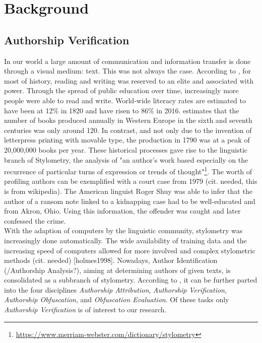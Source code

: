 \chapter{Background}\label{ch:background}
\section{Authorship Verification}\label{sec:authorship-verification}
In our world a large amount of communication and information transfer is done through a visual medium: text.
This was not always the case.
According to \cite{owidliteracy}, for most of history, reading and writing was reserved to an elite and associated with power.
Through the spread of public education over time, increasingly more people were able to read and write.
World-wide literacy rates are estimated to have been at 12\% in 1820 and have risen to 86\% in 2016.
\cite{buringh2009charting} estimates that the number of books produced annually in Western Europe in the sixth and seventh centuries was only around 120.
In contrast, and not only due to the invention of letterpress printing with movable type, the production in 1790 was at a peak of 20,000,000 books per year.
These historical processes gave rise to the linguistic branch of Stylometry, the analysis of "an author's work based especially on the recurrence of particular turns of expression or trends of thought"\footnote{\url{https://www.merriam-webster.com/dictionary/stylometry}}.
The worth of profiling authors can be exemplified with a court case from 1979 (cit. needed, this is from wikipedia).
The American linguist Roger Shuy was able to infer that the author of a ransom note linked to a kidnapping case had to be well-educated and from Akron, Ohio.
Using this information, the offender was caught and later confessed the crime.\\
With the adaption of computers by the linguistic community, stylometry was increasingly done automatically.
The wide availability of training data and the increasing speed of computers allowed for more involved and complex stylometric methods (cit. needed) [holmes1998].
Nowadays, Author Identification (/Authorship Analysis?), aiming at determining authors of given texts, is consolidated as a subbranch of stylometry.
According to \cite{bevendorff2020shared}, it can be further parted into the four disciplines \textit{Authorship Attribution}, \textit{Authorship Verification}, \textit{Authorship Obfuscation}, and \textit{Obfuscation Evaluation}.
Of these tasks only \textit{Authorship Verification} is of interest to our research.
